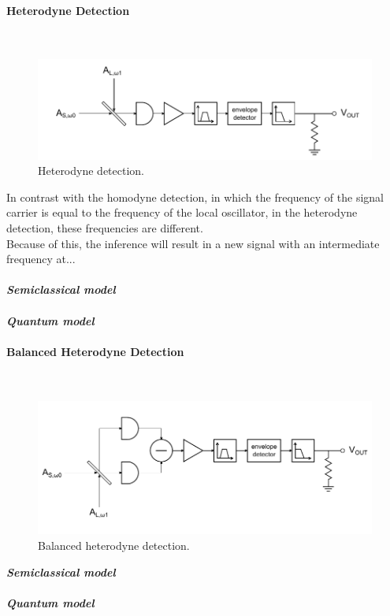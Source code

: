 \begin{bibunit}[plain]
\paragraph{Heterodyne Detection}\ \\
\begin{figure}[H]
	\centering
	\includegraphics{./sdf/optical_detection/figures/detection-heterodyne.pdf}
	\caption{Heterodyne detection.}
\end{figure}

In contrast with the homodyne detection, in which the frequency of the signal carrier is equal to the frequency of the local oscillator, in the heterodyne detection, these frequencies are different.\\
Because of this, the inference will result in a new signal with an intermediate frequency at...\\
\\
{\bf \em Semiclassical model}\\
\\
{\bf \em Quantum model}\\


\paragraph{Balanced Heterodyne Detection}\ \\
\begin{figure}[H]
	\centering
	\includegraphics{./sdf/optical_detection/figures/detection-balanced-heterodyne.pdf}
	\caption{Balanced heterodyne detection.}
\end{figure}
%
\noindent
{\bf \em Semiclassical model}\\
\\
{\bf \em Quantum model}\\



\end{bibunit}
